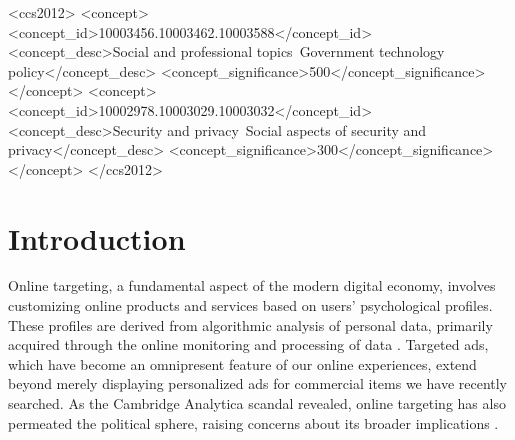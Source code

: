 \documentclass[preprint]{acmart}
\begin{document}
\begin{CCSXML}
<ccs2012>
   <concept>
       <concept_id>10003456.10003462.10003588</concept_id>
       <concept_desc>Social and professional topics~Government technology policy</concept_desc>
       <concept_significance>500</concept_significance>
       </concept>
   <concept>
       <concept_id>10002978.10003029.10003032</concept_id>
       <concept_desc>Security and privacy~Social aspects of security and privacy</concept_desc>
       <concept_significance>300</concept_significance>
       </concept>
 </ccs2012>
\end{CCSXML}





\maketitle

\section{Introduction}

Online targeting, a fundamental aspect of the modern digital economy, involves customizing online products and services based on users' psychological profiles. These profiles are derived from algorithmic analysis of personal data, primarily acquired through the online monitoring and processing of data \cite{Beer2019,Koene2015}. Targeted ads, which have become an omnipresent feature of our online experiences, extend beyond merely displaying personalized ads for commercial items we have recently searched. As the Cambridge Analytica scandal revealed, online targeting has also permeated the political sphere, raising concerns about its broader implications \cite{schneble2018}.
\end{document}
